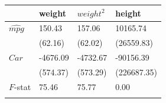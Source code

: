 \begin{tabular}{llll}
\toprule
 & weight & $weight^2$ & height \\
\midrule
$\hat{mpg}$ & 150.43 & 157.06 & 10165.74 \\
 & (62.16) & (62.02) & (26559.83) \\
$Car$ & -4676.09 & -4732.67 & -90156.39 \\
 & (574.37) & (573.29) & (226687.35) \\
$F$-stat & 75.46 & 75.77 & 0.00 \\
 &  &  &  \\
\bottomrule
\end{tabular}
